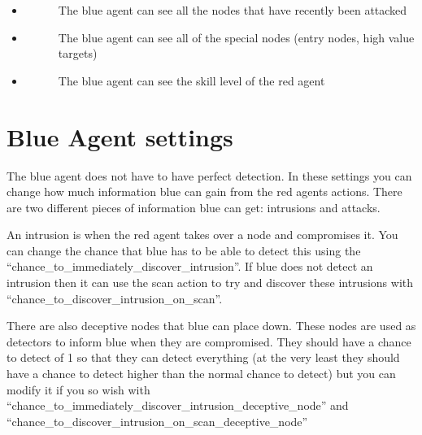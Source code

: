 \documentclass[letterpaper,10pt,english]{sphinxmanual}
\begin{document}
\begin{itemize}
\begin{description}
\end{description}

\item {} \begin{description}
\item[{}] \leavevmode
\sphinxAtStartPar
The blue agent can see all the nodes that have recently been attacked

\end{description}

\item {} \begin{description}
\item[{}] \leavevmode
\sphinxAtStartPar
The blue agent can see all of the special nodes (entry nodes, high value targets)

\end{description}

\item {} \begin{description}
\item[{}] \leavevmode
\sphinxAtStartPar
The blue agent can see the skill level of the red agent

\end{description}

\end{itemize}


\section{Blue Agent settings}
\label{\detokenize{source/config_file:blue-agent-settings}}
\sphinxAtStartPar
The blue agent does not have to have perfect detection. In these settings you can change how much information blue
can gain from the red agents actions. There are two different pieces of information blue can get: intrusions and
attacks.

\sphinxAtStartPar
{}

\sphinxAtStartPar
An intrusion is when the red agent takes over a node and compromises it. You can change the chance that blue has to
be able to detect this using the “chance\_to\_immediately\_discover\_intrusion”. If blue does not detect an intrusion
then it can use the scan action to try and discover these intrusions with “chance\_to\_discover\_intrusion\_on\_scan”.

\sphinxAtStartPar
There are also deceptive nodes that blue can place down. These nodes are used as detectors to inform blue when they
are compromised. They should have a chance to detect of 1 so that they can detect everything (at the very least
they should have a chance to detect higher than the normal chance to detect) but you can modify it if you so wish
with “chance\_to\_immediately\_discover\_intrusion\_deceptive\_node” and “chance\_to\_discover\_intrusion\_on\_scan\_deceptive\_node”
\end{document}
